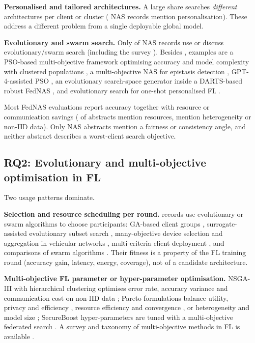 \documentclass[11pt,a4paper]{article}
\begin{document}
\textbf{Personalised and tailored architectures.} A large share searches \emph{different} architectures per client or cluster \cite{mushtaq2021spider,yan2024peaches,yang2025heterogeneityaware,zhang2022toward,yan2026pfedzkd} (\nnaspers{} NAS records mention personalisation). These address a different problem from a single deployable global model.

\textbf{Evolutionary and swarm search.} Only \nnasevo{} of \nnas{} NAS records use or discuss evolutionary/swarm search (including the survey \cite{zhu2021from}). Besides \cite{zhu2021realtime}, examples are a PSO-based multi-objective framework optimising accuracy and model complexity with clustered populations \cite{li2026multiobjective}, a multi-objective NAS for epistasis detection \cite{wu2024a}, GPT-4-assisted PSO \cite{wang2024federated}, an evolutionary search-space generator inside a DARTS-based robust FedNAS \cite{zhang2024privacypreserving}, and evolutionary search for one-shot personalised FL \cite{yan2026pfedzkd}.

Most FedNAS evaluations report accuracy together with resource or communication savings (\nnasres{} of \nnas{} abstracts mention resources, \nnasnoniid{} mention heterogeneity or non-IID data). Only \nnasfair{} NAS abstracts mention a fairness or consistency angle, and neither abstract describes a worst-client search objective.

\subsection{RQ2: Evolutionary and multi-objective optimisation in FL}
Two usage patterns dominate.

\textbf{Selection and resource scheduling per round.} \nevosel{} records use evolutionary or swarm algorithms to choose participants: GA-based client groups \cite{umar2026resilient,kang2023ga}, surrogate-assisted evolutionary subset search \cite{qiang2026evocsfl}, many-objective device selection and aggregation in vehicular networks \cite{wen2024a,cai2025a}, multi-criteria client deployment \cite{chahoud2023ondemandfl}, and comparisons of swarm algorithms \cite{khan2024swarm,rodrigues2026psobased}. Their fitness is a property of the FL training round (accuracy gain, latency, energy, coverage), not of a candidate architecture.

\textbf{Multi-objective FL parameter or hyper-parameter optimisation.} NSGA-III with hierarchical clustering optimises error rate, accuracy variance and communication cost on non-IID data \cite{zhong2022optimizing}; Pareto formulations balance utility, privacy and efficiency \cite{kang2024optimizing}, resource efficiency and convergence \cite{jung2024federated}, or heterogeneity and model size \cite{tursunboev2025multiobjective}; SecureBoost hyper-parameters are tuned with a multi-objective federated search \cite{ren2023secureboost}. A survey and taxonomy of multi-objective methods in FL is available \cite{hartmann2025multiobjective}.
\end{document}
